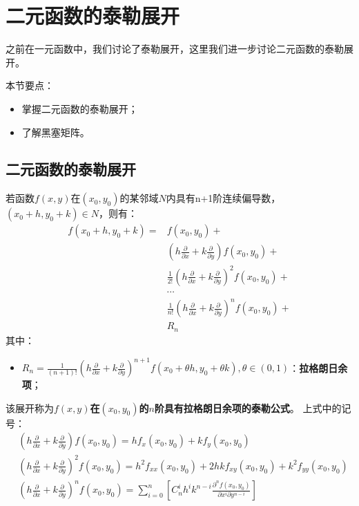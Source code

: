 \section{二元函数的泰勒展开}

之前在一元函数中，我们讨论了泰勒展开，这里我们进一步讨论二元函数的泰勒展开。

本节要点：
\begin{itemize}
    \item 掌握二元函数的泰勒展开；
    \item 了解黑塞矩阵。
\end{itemize}

\subsection{二元函数的泰勒展开}

\begin{theorem}
若函数$f\left( x,y \right) $在$\left( x_0,y_0 \right) $的某邻域$N$内具有n+1阶连续偏导数，$\left( x_0+h,y_0+k \right) \in N$，则有：
\begin{align*}
f\left( x_0+h,y_0+k \right) =&f\left( x_0,y_0 \right) + \\
&\left( h\frac{\partial}{\partial x}+k\frac{\partial}{\partial y} \right) f\left( x_0,y_0 \right) + \\
&\frac{1}{2!}\left( h\frac{\partial}{\partial x}+k\frac{\partial}{\partial y} \right) ^2f\left( x_0,y_0 \right) + \\
&\cdots \\
&\frac{1}{n!}\left( h\frac{\partial}{\partial x}+k\frac{\partial}{\partial y} \right) ^nf\left( x_0,y_0 \right) + \\
&R_n
\end{align*}
其中：
\begin{itemize}
    \item $R_n=\frac{1}{\left( n+1 \right) !}\left( h\frac{\partial}{\partial x}+k\frac{\partial}{\partial y} \right) ^{n+1}f\left( x_0+\theta h,y_0+\theta k \right) ,\theta \in \left( 0,1 \right) $：{\bf 拉格朗日余项}；
\end{itemize}
该展开称为{\bf $f\left( x,y \right) $在$\left( x_0,y_0 \right) $的$n$阶具有拉格朗日余项的泰勒公式}。
上式中的记号：
\begin{align*}
&\left( h\frac{\partial}{\partial x}+k\frac{\partial}{\partial y} \right) f\left( x_0,y_0 \right) =hf_x\left( x_0,y_0 \right) +kf_y\left( x_0,y_0 \right) \\
&\left( h\frac{\partial}{\partial x}+k\frac{\partial}{\partial y} \right) ^2f\left( x_0,y_0 \right) =h^2f_{xx}\left( x_0,y_0 \right) +2hkf_{xy}\left( x_0,y_0 \right) +k^2f_{yy}\left( x_0,y_0 \right) \\
&\left( h\frac{\partial}{\partial x}+k\frac{\partial}{\partial y} \right) ^nf\left( x_0,y_0 \right) =\sum_{i=0}^n{\left[ C_{n}^{i}h^ik^{n-i}\frac{\partial ^nf\left( x_0,y_0 \right)}{\partial x^i\partial y^{n-i}} \right]}
\end{align*}
\end{theorem}

